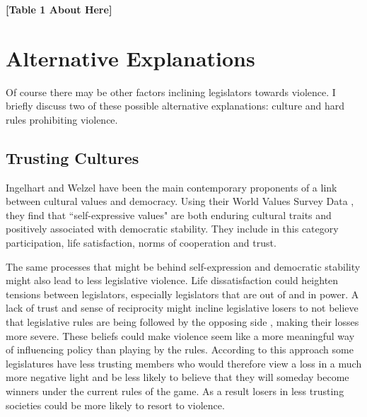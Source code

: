 \documentclass[a4paper]{article}\usepackage{graphicx, color}
\begin{document}
{\begin{center}

    {\bf{[Table 1 About Here]}}

\end{center} 

\section{Alternative Explanations}

Of course there may be other factors inclining legislators towards violence. I briefly discuss two of these possible alternative explanations: culture and hard rules prohibiting violence.

\subsection{Trusting Cultures}

Ingelhart and Welzel \citep{Inglehart1988, Inglehart2005, Inglehart2010} have been the main contemporary proponents of a link between cultural values and democracy. Using their World Values Survey Data \citeyearpar[the most recent version is from][]{WVS2009}, they find that ``self-expressive values" are both enduring cultural traits and positively associated with democratic stability. They include in this category participation, life satisfaction, norms of cooperation and trust. 

The same processes that might be behind self-expression and democratic stability might also lead to less legislative violence. Life dissatisfaction could heighten tensions between legislators, especially legislators that are out of and in power. A lack of trust and sense of reciprocity might incline legislative losers to not believe that legislative rules are being followed by the opposing side \citep{Tyler1998}, making their losses more severe. These beliefs could make violence seem like a more meaningful way of influencing policy than playing by the rules. According to this approach some legislatures have less trusting members who would therefore view a loss in a much more negative light and be less likely to believe that they will someday become winners under the current rules of the game. As a result losers in less trusting societies could be more likely to resort to violence. 

}
\end{document}
